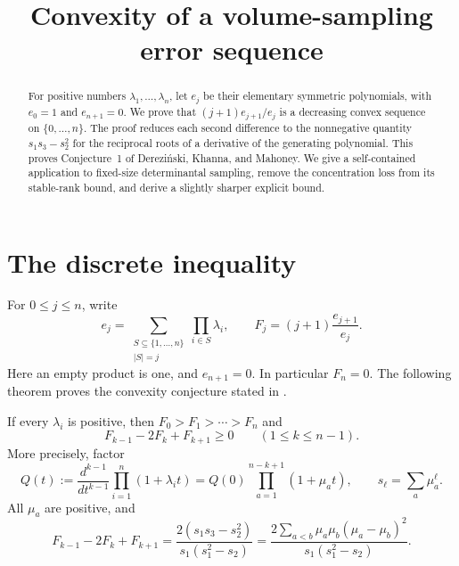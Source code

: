 \documentclass[11pt]{article}
\title{Convexity of a volume-sampling error sequence}
\author{}
\date{}
\begin{document}
\maketitle
\begin{abstract}
For positive numbers $\lambda_1,\ldots,\lambda_n$, let $e_j$ be their elementary symmetric polynomials, with $e_0=1$ and $e_{n+1}=0$. We prove that $(j+1)e_{j+1}/e_j$ is a decreasing convex sequence on $\{0,\ldots,n\}$. The proof reduces each second difference to the nonnegative quantity $s_1s_3-s_2^2$ for the reciprocal roots of a derivative of the generating polynomial. This proves Conjecture~1 of Derezi\'nski, Khanna, and Mahoney. We give a self-contained application to fixed-size determinantal sampling, remove the concentration loss from its stable-rank bound, and derive a slightly sharper explicit bound.
\end{abstract}

\section{The discrete inequality}
For $0\le j\le n$, write
\[
 e_j=\sum_{\substack{S\subseteq\{1,\ldots,n\}\\|S|=j}}
       \prod_{i\in S}\lambda_i,
 \qquad F_j=(j+1)\frac{e_{j+1}}{e_j}.
\]
Here an empty product is one, and $e_{n+1}=0$. In particular $F_n=0$. The following theorem proves the convexity conjecture stated in \cite[Section~5, Conjecture~1]{DKM2020}.

\begin{theorem}\label{thm:convex}
If every $\lambda_i$ is positive, then $F_0>F_1>\cdots>F_n$ and
\[
 F_{k-1}-2F_k+F_{k+1}\ge0\qquad(1\le k\le n-1).
\]
More precisely, factor
\[
 Q(t):=\frac{d^{k-1}}{dt^{k-1}}\prod_{i=1}^n(1+\lambda_i t)
     =Q(0)\prod_{a=1}^{n-k+1}(1+\mu_a t),
 \qquad s_\ell=\sum_a\mu_a^\ell.
\]
All $\mu_a$ are positive, and
\begin{equation}\label{eq:certificate}
 F_{k-1}-2F_k+F_{k+1}
 =\frac{2(s_1s_3-s_2^2)}{s_1(s_1^2-s_2)}
 =\frac{2\sum_{a<b}\mu_a\mu_b(\mu_a-\mu_b)^2}
        {s_1(s_1^2-s_2)}.
\end{equation}
\end{theorem}
\end{document}
